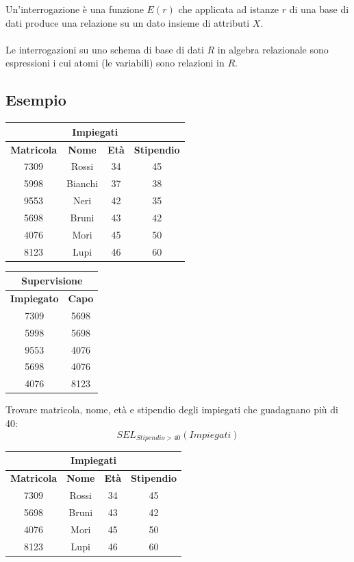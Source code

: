 \documentclass[../main.tex]{subfiles}
\begin{document}
	Un’interrogazione è una funzione $E(r)$ che applicata ad istanze $r$ di una base di dati produce una relazione su un dato insieme di attributi $X$.\\\\
	Le interrogazioni su uno schema di base di dati $R$ in algebra relazionale sono espressioni i cui atomi (le variabili) sono relazioni in $R$.
	\subsection{Esempio}
	\begin{center}
		\begin{tabular}{ |c|c|c|c| }
			\hline
			\multicolumn{4}{|c|}{Impiegati}\\
			\hline
			\textbf{Matricola} & \textbf{Nome} & \textbf{Età} & \textbf{Stipendio}\\
			\hline
			7309 & Rossi & 34 & 45\\
			5998 & Bianchi & 37 & 38\\
			9553 & Neri & 42 & 35\\
			5698 & Bruni & 43 & 42\\
			4076 & Mori & 45 & 50\\
			8123 & Lupi & 46 & 60\\
			\hline
		\end{tabular}
	\end{center}
	\begin{center}
		\begin{tabular}{ |c|c| }
			\hline
			\multicolumn{2}{|c|}{Supervisione}\\
			\hline
			\textbf{Impiegato} & \textbf{Capo} \\
			\hline
			7309 & 5698\\
			5998 & 5698\\
			9553 & 4076\\
			5698 & 4076\\
			4076 & 8123\\
			\hline
		\end{tabular}
	\end{center}
	Trovare matricola, nome, età e stipendio degli impiegati che guadagnano più di 40:
	\[SEL_{Stipendio > 40} (Impiegati)\]
	\begin{center}
		\begin{tabular}{ |c|c|c|c| }
			\hline
			\multicolumn{4}{|c|}{Impiegati}\\
			\hline
			\textbf{Matricola} & \textbf{Nome} & \textbf{Età} & \textbf{Stipendio}\\
			\hline
			7309 & Rossi & 34 & 45\\
			5698 & Bruni & 43 & 42\\
			4076 & Mori & 45 & 50\\
			8123 & Lupi & 46 & 60\\
			\hline
		\end{tabular}
	\end{center}
\end{document}
